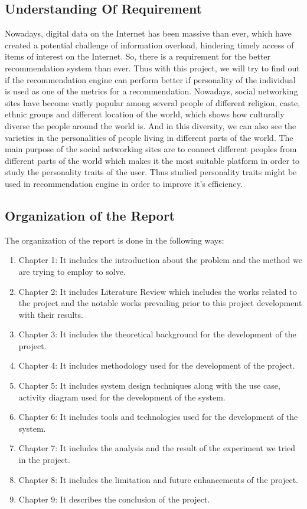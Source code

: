 \subsection{Understanding Of Requirement}
Nowadays, digital data on the Internet has been massive than ever, which have created a potential challenge of information overload, hindering timely access of items of interest on the Internet. So, there is a requirement for the better recommendation system than ever. Thus with this project, we will try to find out if the recommendation engine can perform better if personality of the individual is used as one of the metrics for a recommendation. Nowadays, social networking sites have become vastly popular among several people of different religion, caste, ethnic groups and different location of the world, which shows how culturally diverse the people around the world is. And in this diversity, we can also see the varieties in the personalities of people living in different parts of the world. The main purpose of the social networking sites are to connect different peoples from different parts of the world which makes it the most suitable platform in order to study the personality traits of the user. Thus studied personality traits might be used in recommendation engine in order to improve it's efficiency. %

\subsection{Organization of the Report}
The organization of the report is done in the following ways:
\begin{enumerate}
\item Chapter 1: It includes the introduction about the problem and the method we are trying to employ to solve.
\item Chapter 2: It includes Literature Review which includes the works related to the project and the notable works prevailing prior to this project development with their results.
\item Chapter 3: It includes the theoretical background for the development of the project.
\item Chapter 4: It includes methodology used for the development of the project.
\item Chapter 5: It includes system design techniques along with the use case, activity diagram used for the development of the system.
\item Chapter 6: It includes tools and technologies used for the development of the system.
\item Chapter 7: It includes the analysis and the result of the experiment we tried in the project.
\item Chapter 8: It includes the limitation and future enhancements of the project.
\item Chapter 9: It describes the conclusion of the project.
\end{enumerate}

